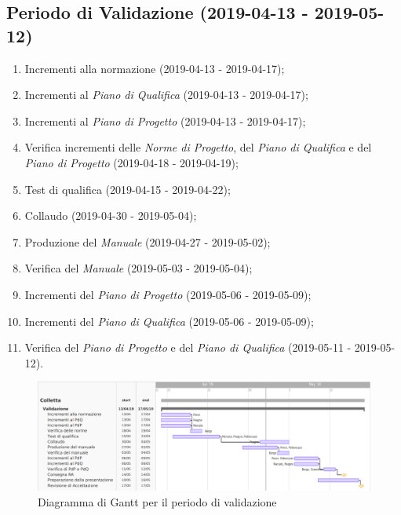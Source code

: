 	\subsection{Periodo di Validazione (2019-04-13 - 2019-05-12)}
		\begin{enumerate}[label= 5.\arabic*)]
			\item Incrementi alla normazione (2019-04-13 - 2019-04-17);
			\item Incrementi al \textit{Piano di Qualifica} (2019-04-13 - 2019-04-17);
			\item Incrementi al \textit{Piano di Progetto} (2019-04-13 - 2019-04-17);
			\item Verifica incrementi delle \textit{Norme di Progetto}, del \textit{Piano di Qualifica} e del \textit{Piano di Progetto} (2019-04-18 - 2019-04-19);
			\item Test di qualifica (2019-04-15 - 2019-04-22);
			\item Collaudo (2019-04-30 - 2019-05-04);
			\item Produzione del \textit{Manuale} (2019-04-27 - 2019-05-02);
			\item Verifica del \textit{Manuale} (2019-05-03 - 2019-05-04);
			\item Incrementi del \textit{Piano di Progetto} (2019-05-06 - 2019-05-09);
			\item Incrementi del \textit{Piano di Qualifica} (2019-05-06 - 2019-05-09);
			\item Verifica del \textit{Piano di Progetto} e del \textit{Piano di Qualifica} (2019-05-11 - 2019-05-12).
		\end{enumerate}

		\begin{figure}[!hbtp]
		\centering
		\includegraphics[scale=0.5, angle=90]{images/ganttval.png}
		\caption{Diagramma di Gantt per il periodo di validazione}
	\end{figure}
		\newpage